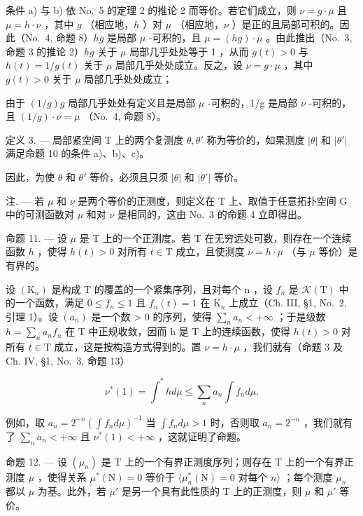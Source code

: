 条件 a) 与 b) 依 No.~5 的定理 2 的推论 2 而等价。若它们成立，则 \(\nu = g \cdot \mu\) 且 \(\mu = h \cdot \nu\) ，其中 \(g\) （相应地，\(h\) ）对 \(\mu\) （相应地，\(\nu\) ）是正的且局部可积的。因此（No.~4, 命题 8）\(hg\) 是局部 \(\mu\) -可积的，且 \(\mu = (hg) \cdot \mu\) 。由此推出（No.~3, 命题 3 的推论 2）\(hg\) 关于 \(\mu\) 局部几乎处处等于 1 ，从而 \(g(t) > 0\) 与 \(h(t) = 1/g(t)\) 关于 \(\mu\) 局部几乎处处成立。反之，设 \(\nu = g \cdot \mu\) ，其中 \(g(t) > 0\) 关于 \(\mu\) 局部几乎处处成立；

由于 \((1/g)g\) 局部几乎处处有定义且是局部 \(\mu\) -可积的，1/g 是局部 \(\nu\) -可积的，且 \((1/g)\cdot\nu=\mu\) （No.~4, 命题 8）。

定义 3. --- 局部紧空间 T 上的两个复测度 \(\theta, \theta'\) 称为等价的，如果测度 \(|\theta|\) 和 \(|\theta'|\) 满足命题 10 的条件 a)、b)、c)。

因此，为使 \(\theta\) 和 \(\theta'\) 等价，必须且只须 \(|\theta|\) 和 \(|\theta'|\) 等价。

注. --- 若 \(\mu\) 和 \(\nu\) 是两个等价的正测度，则定义在 T 上、取值于任意拓扑空间 G 中的可测函数对 \(\mu\) 和对 \(\nu\) 是相同的，这由 No.~3 的命题 4 立即得出。

命题 11. --- 设 \(\mu\) 是 T 上的一个正测度。若 T 在无穷远处可数，则存在一个连续函数 \(h\) ，使得 \(h(t) > 0\) 对所有 \(t \in \mathrm{T}\) 成立，且使测度 \(\nu = h \cdot \mu\) （与 \(\mu\) 等价）是有界的。

设 \((\mathrm{K}_{n})\) 是构成 T 的覆盖的一个紧集序列，且对每个 n ，设 \(f_{n}\) 是 \(\mathcal{K}(\mathrm{T})\) 中的一个函数，满足 \(0 \leqslant f_{n} \leqslant 1\) 且 \(f_{n}(t) = 1\) 在 \(\mathrm{K}_{n}\) 上成立（Ch. III, §1, No.~2, 引理 1）。设 \((a_{n})\) 是一个数 \textgreater{} 0 的序列，使得 \(\sum_{n} a_{n} < +\infty\) ；于是级数 \(h = \sum_{n} a_{n} f_{n}\) 在 T 中正规收敛，因而 h 是 T 上的连续函数，使得 \(h(t) > 0\) 对所有 \(t \in \mathrm{T}\) 成立，这是按构造方式得到的。置 \(\nu = h \cdot \mu\) ，我们就有（命题 3 及 Ch. IV, §1, No.~3, 命题 13）

\[
\nu^ {*} (1) = \int^ {*} h d \mu \leqslant \sum_ {n} a _ {n} \int f _ {n} d \mu .
\]

例如，取 \(a_{n} = 2^{-n}\left(\int f_{n}d\mu\right)^{-1}\) 当 \(\int f_n d\mu > 1\) 时，否则取 \(a_{n} = 2^{-n}\) ，我们就有了 \(\sum_{n}a_{n} < +\infty\) 且 \(\nu^{*}(1) < +\infty\) ，这就证明了命题。

命题 12. --- 设 \((\mu_n)\) 是 T 上的一个有界正测度序列；则存在 T 上的一个有界正测度 \(\mu\) ，使得关系 \(\mu^*(\mathrm{N}) = 0\) 等价于 \(\langle \mu_n^*(\mathrm{N}) = 0 \text{ 对每个 } n \rangle\) ；每个测度 \(\mu_n\) 都以 \(\mu\) 为基。此外，若 \(\mu'\) 是另一个具有此性质的 T 上的正测度，则 \(\mu\) 和 \(\mu'\) 等价。

